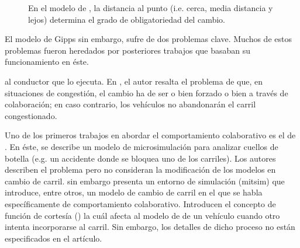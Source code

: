 \begin{figure}[t]
	\caption[Efecto de la distancia en el tipo de cambio de carril según el modelo de \cite{Gipps1986}]{En el modelo de \cite{Gipps1986}, la distancia al punto (i.e. cerca, media distancia y lejos) determina el grado de obligatoriedad del cambio.}
	\label{fig:lane-change-type-depending-on-the-distance}
\end{figure}


El modelo de Gipps sin embargo, sufre de dos problemas clave. Muchos de estos problemas fueron heredados por posteriores trabajos que basaban su funcionamiento en éste.

 al conductor que lo ejecuta. En \cite{Hidas2002}, el autor resalta el problema de que, en situaciones de congestión, el cambio ha de ser o bien forzado o bien a través de colaboración; en caso contrario, los vehículos no abandonarán el carril congestionado.

Uno de los primeros trabajos en abordar el comportamiento colaborativo es el de \cite{Fritzsche1994}. En éste, se describe un modelo de microsimulación para analizar cuellos de botella (e.g. un accidente donde se bloquea uno de los carriles). Los autores describen el problema pero no consideran la modificación de los modelos en cambio de carril. \cite{Yang1996} sin embargo presenta un entorno de simulación (\gls{mitsim}) que introduce, entre otros, un modelo de cambio de carril en el que se habla específicamente de comportamiento colaborativo. Introducen el concepto de función de cortesía (\textit{}) la cuál afecta al modelo de \textit{} de un vehículo cuando otro intenta incorporarse al carril. Sin embargo, los detalles de dicho proceso no están especificados en el artículo.

